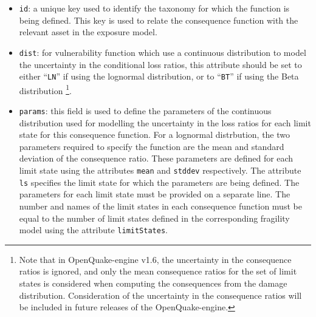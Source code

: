 \begin{itemize}

    \item \Verb+id+: a unique key used to identify the \gls{taxonomy} for 
    which the function is being defined. This key is used to relate the 
    \gls{consequence function} with the relevant \gls{asset} in the 
    \gls{exposure model}.

    \item \Verb+dist+: for vulnerability function which use a continuous 
    distribution to model the uncertainty in the conditional loss ratios, 
    this attribute should be set to either ``\Verb+LN+'' if using the lognormal
    distribution, or to ``\Verb+BT+'' if using the Beta distribution
    \footnote{Note that in OpenQuake-engine v1.6, the uncertainty in the 
    consequence ratios is ignored, and only the mean consequence ratios for the
    set of limit states is considered when computing the consequences from the
    damage distribution. Consideration of the uncertainty in the consequence
    ratios will be included in future releases of the OpenQuake-engine.}.

    \item \Verb+params+: this field is used to define the parameters of 
    the continuous distribution used for modelling the uncertainty in the
    loss ratios for each limit state for this 
    \gls{consequence function}. For a lognormal distrbution, 
    the two parameters required to specify the function are the mean and 
    standard deviation of the consequence ratio. These parameters are defined for 
    each limit state using the attributes \Verb+mean+ and \Verb+stddev+ 
    respectively. The attribute \Verb+ls+ specifies the limit state for which 
    the parameters are being defined. The parameters for each limit state
    must be provided on a separate line. The number and names of the limit 
    states in each \gls{consequence function} must be equal to the number of limit 
    states defined in the corresponding \gls{fragility model}
    using the attribute \Verb+limitStates+.

\end{itemize}